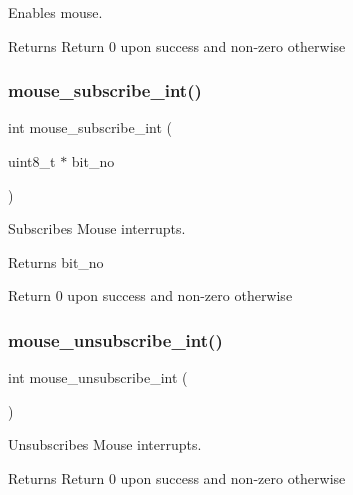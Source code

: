 Enables mouse. 

\begin{DoxyReturn}{Returns}
Return 0 upon success and non-\/zero otherwise 
\end{DoxyReturn}
\mbox{\label{group__mouse_ga9da18257ff113b686bb826d154bfaa87}} 
\subsubsection{\texorpdfstring{mouse\_subscribe\_int()}{mouse\_subscribe\_int()}}
{\footnotesize\ttfamily int mouse\+\_\+subscribe\+\_\+int (\begin{DoxyParamCaption}\item[{uint8\+\_\+t $\ast$}]{bit\+\_\+no }\end{DoxyParamCaption})}



Subscribes Mouse interrupts. 

\begin{DoxyReturn}{Returns}
bit\+\_\+no 

Return 0 upon success and non-\/zero otherwise 
\end{DoxyReturn}
\mbox{\label{group__mouse_ga685ad2706aca36d9869a30a19b9f446a}} 
\subsubsection{\texorpdfstring{mouse\_unsubscribe\_int()}{mouse\_unsubscribe\_int()}}
{\footnotesize\ttfamily int mouse\+\_\+unsubscribe\+\_\+int (\begin{DoxyParamCaption}{ }\end{DoxyParamCaption})}



Unsubscribes Mouse interrupts. 

\begin{DoxyReturn}{Returns}
Return 0 upon success and non-\/zero otherwise 
\end{DoxyReturn}
\mbox{\label{group__mouse_gad82d7239d54c89cbccd5c7e8f742973d}} 
